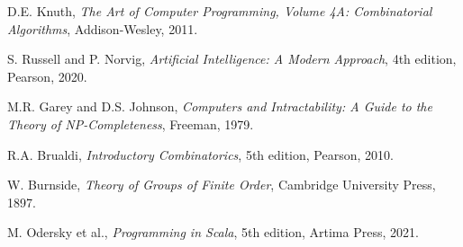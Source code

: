 \documentclass[12pt,a4paper]{article}
\theoremstyle{definition}
\begin{document}

\begin{thebibliography}{99}

D.E. Knuth, \emph{The Art of Computer Programming, Volume 4A: Combinatorial Algorithms}, Addison-Wesley, 2011.

S. Russell and P. Norvig, \emph{Artificial Intelligence: A Modern Approach}, 4th edition, Pearson, 2020.

M.R. Garey and D.S. Johnson, \emph{Computers and Intractability: A Guide to the Theory of NP-Completeness}, Freeman, 1979.

R.A. Brualdi, \emph{Introductory Combinatorics}, 5th edition, Pearson, 2010.

W. Burnside, \emph{Theory of Groups of Finite Order}, Cambridge University Press, 1897.

M. Odersky et al., \emph{Programming in Scala}, 5th edition, Artima Press, 2021.

\end{thebibliography}
\end{document}

